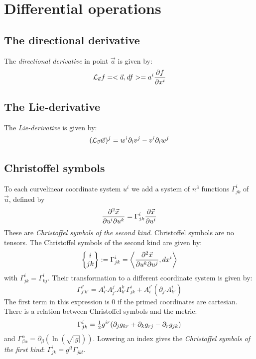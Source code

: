 \documentclass[twoside]{report}
\begin{document}
\section{Differential operations}
\subsection{The directional derivative}
The {\it directional derivative} in point $\vec{a}$ is given by:
\[
{\cal L}_{\vec{a}}f=<\vec{a},df>=a^i\frac{\partial f}{\partial x^i}
\]

\subsection{The Lie-derivative}
The {\it Lie-derivative} is given by:
\[
({\cal L}_{\vec{v}}\vec{w})^j=w^i\partial_iv^j-v^i\partial_iw^j
\]

\subsection{Christoffel symbols}
To each curvelinear coordinate system $u^i$ we add a system of $n^3$
functions $\Gamma^i_{jk}$ of $\vec{u}$, defined by
\[
\frac{\partial^2\vec{x}}{\partial u^i\partial u^k}=\Gamma_{jk}^i\frac{\partial \vec{x}}{\partial u^i}
\]
These are {\it Christoffel symbols of the second kind}. Christoffel symbols
are no tensors. The Christoffel symbols of the second kind are given by:
\[
\left\{\begin{array}{@{}c@{}}i\\ jk \end{array}\right\}:=\Gamma^i_{jk}=
\left\langle\frac{\partial^2\vec{x}}{\partial u^k\partial u^j},dx^i\right\rangle
\]
with $\Gamma^i_{jk}=\Gamma^i_{kj}$. Their transformation to a different
coordinate system is given by:
\[
\Gamma_{j'k'}^{i'}=A_{i'}^iA_{j'}^jA_{k'}^k\Gamma^i_{jk}+A_i^{i'}(\partial_{j'}A_{k'}^i)
\]
The first term in this expression is 0 if the primed coordinates are
cartesian.
\npar
There is a relation between Christoffel symbols and the metric:
\[
\Gamma_{jk}^i=\mbox{$\frac{1}{2}$} g^{ir}(\partial_j g_{kr}+\partial_k g_{rj}-\partial_r g_{jk})
\]
and $\Gamma^\alpha_{\beta\alpha}=\partial_\beta(\ln(\sqrt{|g|}))$.
\npar
Lowering an index gives the {\it Christoffel symbols of the first kind}:
$\Gamma^i_{jk}=g^{il}\Gamma_{jkl}$.
\end{document}
